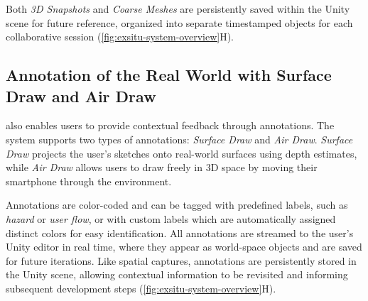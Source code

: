 Both \textit{3D Snapshots} and \textit{Coarse Meshes} are persistently saved within the Unity scene for future reference, organized into separate timestamped objects for each collaborative session (\cref{fig:exsitu-system-overview}H).

\subsection{Annotation of the Real World with Surface Draw and Air Draw}

\SystemName also enables \insitu users to provide contextual feedback through annotations. The system supports two types of annotations: \textit{Surface Draw} and \textit{Air Draw}. \textit{Surface Draw} projects the \insitu user's sketches onto real-world surfaces using depth estimates, while \textit{Air Draw} allows users to draw freely in 3D space by moving their smartphone through the environment.

Annotations are color-coded and can be tagged with predefined labels, such as \textit{hazard} or \textit{user flow}, or with custom labels which are automatically assigned distinct colors for easy identification. All annotations are streamed to the \exsitu user's Unity editor in real time, where they appear as world-space objects and are saved for future iterations. Like spatial captures, annotations are persistently stored in the Unity scene, allowing contextual information to be revisited and informing subsequent development steps (\cref{fig:exsitu-system-overview}H).
